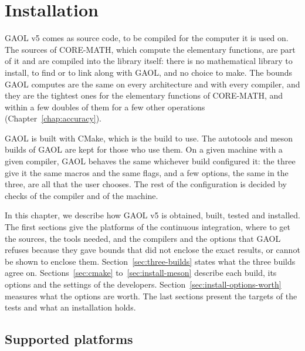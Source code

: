\chapter{Installation}\label{chap:installation}

GAOL v5 comes as source code, to be compiled for the computer it is used on.
The sources of CORE-MATH, which compute the elementary functions, are part of
it and are compiled into the library  itself: there is no
mathematical library to install, to find or to link along with GAOL, and no
choice to make. The bounds GAOL computes are the same on every architecture
and with every compiler, and they are the tightest ones for the elementary
functions of CORE-MATH, and within a few doubles of them for a few other
operations (Chapter~\ref{chap:accuracy}).

\medskip
GAOL is built with CMake, which is the build to use. The autotools and meson
builds of GAOL are kept for those who use them. On a given machine with a
given compiler, GAOL behaves the same whichever build configured it: the three
give it the same macros and the same flags, and a few options, the same in the
three, are all that the user chooses. The rest of the configuration is decided
by checks of the compiler and of the machine.

\medskip
In this chapter, we describe how GAOL v5 is obtained, built, tested and
installed. The first sections give the platforms of the continuous
integration, where to get the sources, the tools needed, and the compilers and
the options that GAOL refuses because they gave bounds that did not enclose
the exact results, or cannot be shown to enclose them. Section~\ref{sec:three-builds} states what the three builds
agree on. Sections~\ref{sec:cmake} to~\ref{sec:install-meson} describe each
build, its options and the settings of the developers.
Section~\ref{sec:install-options-worth} measures what the options are worth.
The last sections present the targets of the tests and what an installation
holds.

\section{Supported platforms}\label{sec:platforms}
%

